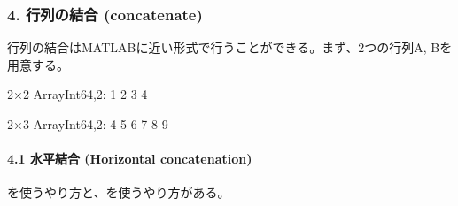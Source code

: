 \documentclass[letterpaper,10pt,english]{sphinxmanual}
\begin{document}
\begin{sphinxVerbatim}[commandchars=\\\{\}]
 
\end{sphinxVerbatim}

\begin{sphinxVerbatim}[commandchars=\\\{\}]
[1.0 1.0 1.0]
\end{sphinxVerbatim}


\subsubsection{4. 行列の結合 (concatenate)}
\label{\detokenize{tips:concatenate}}
行列の結合はMATLABに近い形式で行うことができる。まず、2つの行列A, Bを用意する。

\begin{sphinxVerbatim}[commandchars=\\\{\}]
  \PYG{p}{[}   \PYG{p}{]}
\end{sphinxVerbatim}

\begin{sphinxVerbatim}[commandchars=\\\{\}]
2×2 Array\PYGZob{}Int64,2\PYGZcb{}:
 1  2
 3  4
\end{sphinxVerbatim}

\begin{sphinxVerbatim}[commandchars=\\\{\}]
  \PYG{p}{[}     \PYG{p}{]}
\end{sphinxVerbatim}

\begin{sphinxVerbatim}[commandchars=\\\{\}]
2×3 Array\PYGZob{}Int64,2\PYGZcb{}:
 4  5  6
 7  8  9
\end{sphinxVerbatim}


\paragraph{4.1 水平結合 (Horizontal concatenation)}
\label{\detokenize{tips:horizontal-concatenation}}
を使うやり方と、\sphinxcode{\sphinxupquote{{[} {]}}}を使うやり方がある。
\end{document}
